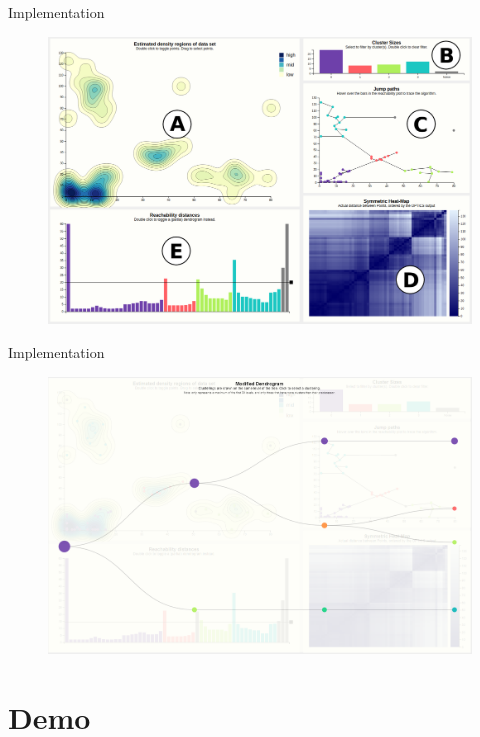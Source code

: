\documentclass[naustrian]{beamer}
\begin{document}
\begin{frame}{Implementation}
    \begin{figure}[H]
        \centering
        \includegraphics[height=0.85\textheight]{img/opticsvis-overview}
    \end{figure}
\end{frame}

\begin{frame}{Implementation}
    \begin{figure}[H]
        \centering
        \includegraphics[height=0.80\textheight]{img/tree}
    \end{figure}
\end{frame}

{
\section{Demo}
}
\end{document}
